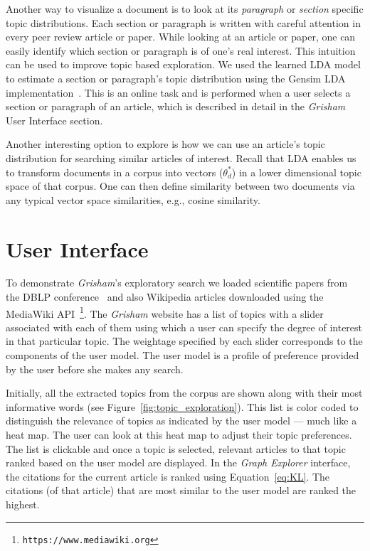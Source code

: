 \documentclass[letterpaper]{article}
\newcommand{\system}{\textsl{Grisham}\xspace}
\begin{document}
Another way to visualize a document is to look at its 
\textsl{paragraph} or \textsl{section} specific topic distributions. 
Each section or paragraph is written with careful attention in every 
peer review article or paper. While looking at an article or paper,  
one can easily identify which section or paragraph is of one's real 
interest. This intuition can be used to improve topic based 
exploration. We used the learned LDA model to 
estimate a section or paragraph's topic distribution using the
Gensim LDA implementation~\cite{rehurek_lrec}. This is an 
online task and is performed when a user selects a section or 
paragraph of an article, which is described in detail in the \system 
User Interface section.


Another interesting option to explore is how we can use an article's 
topic distribution for searching similar articles of interest. 
Recall that LDA enables us to transform documents in a corpus into 
vectors ($\theta^*_{d}$) in a lower dimensional topic space 
of that corpus. One can then define similarity between two documents 
via any typical vector space similarities, e.g., cosine similarity. 





\section{User Interface}
\label{sec:demo}


To demonstrate \system's exploratory search we loaded scientific 
papers from the DBLP conference~\cite{Tang:2008:EMA:1367497.1367722} 
and also Wikipedia articles downloaded using the MediaWiki API~\footnote{\texttt{https://www.mediawiki.org}}.
The {\system} website has a list of topics with a slider associated 
with each of them using which a user can specify the degree of 
interest in that particular topic. The weightage specified by each 
slider corresponds to the components of the user model. The user 
model is a profile of preference provided by the user before she 
makes any search.

Initially, all the extracted topics from the corpus are shown along 
with their most informative words (see Figure~\ref{fig:topic_exploration}).
This list is color coded to distinguish the relevance of topics as indicated by the user model --- much like a heat map.
The user can look at this heat map to adjust their topic preferences.
The list is clickable and once a topic is selected, relevant articles to that topic ranked based on the user model are displayed.
In the \textsl{Graph Explorer} interface, the citations for the current article is ranked
using Equation~\ref{eq:KL}. The citations (of that article) that are most
similar to the user model are ranked the highest.
\end{document}
